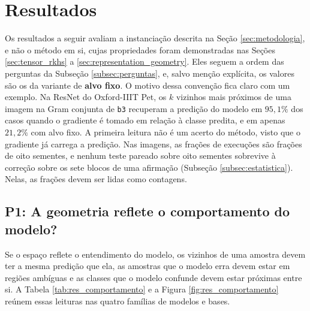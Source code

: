 \section{Resultados}\label{sec:resultados}

Os resultados a seguir avaliam a instanciação descrita na Seção \ref{sec:metodologia}, e não o método em si, cujas propriedades foram demonstradas nas Seções \ref{sec:tensor_rkhs} a \ref{sec:representation_geometry}. Eles seguem a ordem das perguntas da Subseção \ref{subsec:perguntas}, e, salvo menção explícita, os valores são os da variante de \textbf{alvo fixo}. O motivo dessa convenção fica claro com um exemplo. Na ResNet do Oxford-IIIT Pet, os $k$ vizinhos mais próximos de uma imagem na Gram conjunta de \texttt{b3} recuperam a predição do modelo em $95{,}1\%$ dos casos quando o gradiente é tomado em relação à classe predita, e em apenas $21{,}2\%$ com alvo fixo. A primeira leitura não é um acerto do método, visto que o gradiente já carrega a predição. Nas imagens, as frações de execuções são frações de oito sementes, e nenhum teste pareado sobre oito sementes sobrevive à correção sobre os sete blocos de uma afirmação (Subseção \ref{subsec:estatistica}). Nelas, as frações devem ser lidas como contagens.

\subsection{P1: A geometria reflete o comportamento do modelo?}\label{subsec:res_comportamento}

Se o espaço reflete o entendimento do modelo, os vizinhos de uma amostra devem ter a mesma predição que ela, as amostras que o modelo erra devem estar em regiões ambíguas e as classes que o modelo confunde devem estar próximas entre si. A Tabela \ref{tab:res_comportamento} e a Figura \ref{fig:res_comportamento} reúnem essas leituras nas quatro famílias de modelos e bases.

